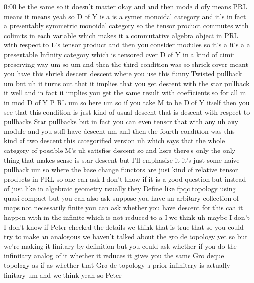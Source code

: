 \begin{unfinished}{0:00}
be  the  same  so  it  doesn't  matter  okay
and  and  then  mode  d  ofy  means  PRL  means
it  means  yeah  so  D  of  Y  is  a  is  a  symet
monoidal  category  and  it's  in  fact  a
presentably  symmetric  monoidal  category
so  the  tensor  product  commutes  with
colimits  in  each  variable  which  makes  it
a  commutative  algebra  object  in  PRL  with
respect  to  L's  tensor  product  and  then
you  consider  modules  so  it's  a  it's  a  a
presentable  Infinity  category  which  is
tensored  over  D  of  Y  in  a  kind  of  cimit
preserving  way
um
so
um  and  then  the
third  condition  was  so  shriek  cover
meant  you  have  this  shriek  descent
descent  where  you  use  this  funny  Twisted
pullback  um  but  uh  it  turns  out  that  it
implies  that  you  get  descent  with  the
star  pullback  it  well  and  in  fact  it
implies  you  get  the  same  result  with
coefficients  so  for  all  m  in  mod  D  of  Y
P  RL
um  so
here
um  so  if  you  take  M  to  be  D  of  Y  itself
then  you  see  that  this  condition  is  just
kind  of  usual  descent  that  is  descent
with  respect  to  pullbacks  Star  pullbacks
but  in  fact  you  can  even  tensor  that
with  any
uh  any  module  and  you  still  have  descent
um  and  then  the  fourth  condition  was
this  kind  of  two  descent  this
categorified  version  uh  which  says
that  the  whole  category  of  possible  M's
uh  satisfies  descent  so  and  here  there's
only  the  only  thing  that  makes  sense  is
star  descent  but  I'll  emphasize  it  it's
just  some  naive
pullback
um
so  where  the  base  change  functors  are
just  kind  of  relative  tensor  products  in
PRL  so  one  can  ask  I  don't  know  if  it  is
a  good  question  but  instead  of  just  like
in  algebraic  geometry  usually  they
Define  like  fpqc  topology  using  quasi
compact  but  you  can  also  ask  suppose  you
have  an  arbitary  collection  of  maps  not
necessarily  finite  you  can  ask  whether
you  have  descent  for  this  can  it  happen
with  in  the  infinite  which  is  not
reduced  to  a  I  we  think  uh  maybe  I  don't
I  don't  know  if  Peter  checked  the
details  we  think  that  is  true  that  so
you  could  try  to  make  an  analogous  we
haven't  talked  about  the  gro  de  topology
yet  so  but  we're  making  it  finitary  by
definition  but  you  could  ask  whether  if
you  do  the  infinitary  analog  of  it
whether  it  reduces  it  gives  you  the  same
Gro  deque  topology  as  if  as  whether  that
Gro  de  topology  a  prior  infinitary  is
actually
finitary  um  and  we  think  yeah  so  Peter

\end{unfinished}
